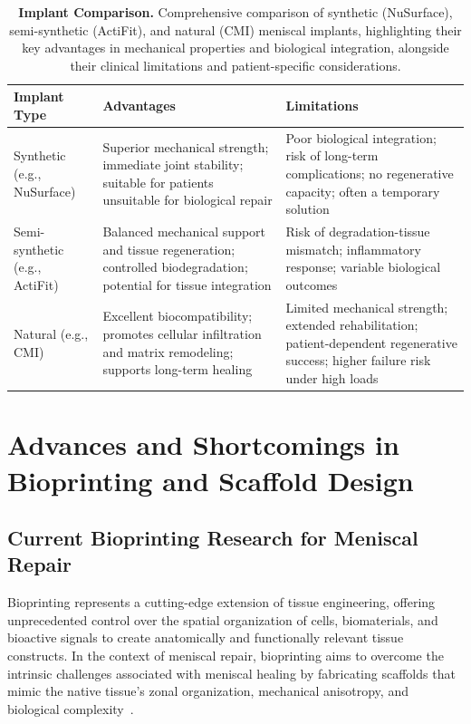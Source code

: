 \begin{table}[H]
    \centering
    \renewcommand{\arraystretch}{1.3}
    \setlength{\tabcolsep}{10pt}
    \begin{tabular}{|p{3.2cm}|p{5.2cm}|p{5.2cm}|}
        \hline
        \rowcolor{blue!20}
        \textbf{Implant Type} & \textbf{Advantages} & \textbf{Limitations} \\ \hline
        Synthetic (e.g., NuSurface) & 
        Superior mechanical strength; immediate joint stability; suitable for patients unsuitable for biological repair & 
        Poor biological integration; risk of long-term complications; no regenerative capacity; often a temporary solution \\ \hline
        Semi-synthetic (e.g., ActiFit) & 
        Balanced mechanical support and tissue regeneration; controlled biodegradation; potential for tissue integration & 
        Risk of degradation-tissue mismatch; inflammatory response; variable biological outcomes \\ \hline
        Natural (e.g., CMI) & 
        Excellent biocompatibility; promotes cellular infiltration and matrix remodeling; supports long-term healing & 
        Limited mechanical strength; extended rehabilitation; patient-dependent regenerative success; higher failure risk under high loads \\ \hline
    \end{tabular}
    \caption{\textbf{Implant Comparison.} Comprehensive comparison of synthetic (NuSurface), semi-synthetic (ActiFit), and natural (CMI) meniscal implants, highlighting their key advantages in mechanical properties and biological integration, alongside their clinical limitations and patient-specific considerations.}
    \label{tab:implant_summary}
\end{table}

\section{Advances and Shortcomings in Bioprinting and Scaffold Design}

\subsection{Current Bioprinting Research for Meniscal Repair}

Bioprinting represents a cutting-edge extension of tissue engineering, offering unprecedented control over the spatial organization of cells, biomaterials, and bioactive signals \cite{engberg2021opensource} to create anatomically and functionally relevant tissue constructs.
In the context of meniscal repair, bioprinting aims to overcome the intrinsic challenges associated with meniscal healing by fabricating scaffolds that mimic the native tissue's zonal organization, mechanical anisotropy, and biological complexity~\cite{sun20213dbioprintingreadytoimplant}.

